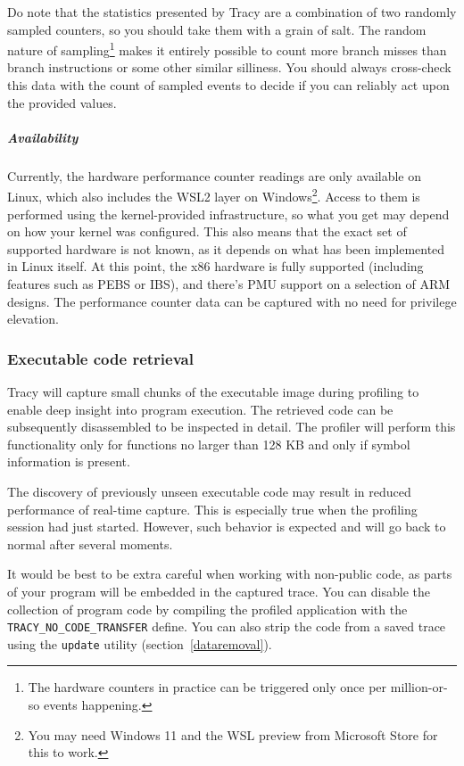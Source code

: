 \documentclass[hidelinks,titlepage,a4paper]{article}
\begin{document}
Do note that the statistics presented by Tracy are a combination of two randomly sampled counters, so you should take them with a grain of salt. The random nature of sampling\footnote{The hardware counters in practice can be triggered only once per million-or-so events happening.} makes it entirely possible to count more branch misses than branch instructions or some other similar silliness. You should always cross-check this data with the count of sampled events to decide if you can reliably act upon the provided values.

\subparagraph{Availability}

Currently, the hardware performance counter readings are only available on Linux, which also includes the WSL2 layer on Windows\footnote{You may need Windows 11 and the WSL preview from Microsoft Store for this to work.}. Access to them is performed using the kernel-provided infrastructure, so what you get may depend on how your kernel was configured. This also means that the exact set of supported hardware is not known, as it depends on what has been implemented in Linux itself. At this point, the x86 hardware is fully supported (including features such as PEBS or IBS), and there's PMU support on a selection of ARM designs. The performance counter data can be captured with no need for privilege elevation.

\subsubsection{Executable code retrieval}
\label{executableretrieval}

Tracy will capture small chunks of the executable image during profiling to enable deep insight into program execution. The retrieved code can be subsequently disassembled to be inspected in detail. The profiler will perform this functionality only for functions no larger than 128 KB and only if symbol information is present.

The discovery of previously unseen executable code may result in reduced performance of real-time capture. This is especially true when the profiling session had just started. However, such behavior is expected and will go back to normal after several moments.

It would be best to be extra careful when working with non-public code, as parts of your program will be embedded in the captured trace. You can disable the collection of program code by compiling the profiled application with the \texttt{TRACY\_NO\_CODE\_TRANSFER} define. You can also strip the code from a saved trace using the \texttt{update} utility (section~\ref{dataremoval}).
\end{document}
